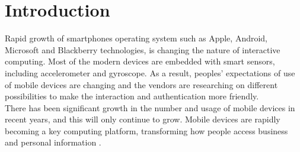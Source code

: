 \documentclass[10pt,halfline,a4paper]{ouparticle}
\begin{document}



\section{Introduction}

\noindent
Rapid growth of smartphones operating system such as Apple, Android, Microsoft and Blackberry technologies, is changing the nature of interactive computing. Most of the modern devices are embedded with smart sensors, including accelerometer and gyroscope. As a result, peoples’ expectations of use of mobile devices are changing and the vendors are researching on different possibilities to make the interaction and authentication more friendly.\\

\noindent
There has been significant growth in the number and usage of mobile devices in recent years, and this will only continue to grow. Mobile devices are rapidly becoming a key computing platform, transforming how people access business and personal information  \cite{Twewin}.\\
\end{document}
